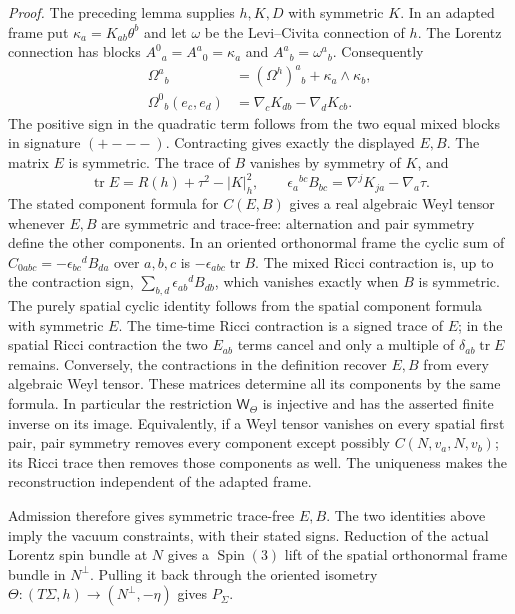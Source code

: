 \documentclass[
  english,
  11pt,
  reqno]{amsart}
\begin{document}
\emph{Proof.} The preceding lemma supplies \(h,K,D\) with symmetric
\(K\). In an adapted frame put \(\kappa_a=K_{ab}\theta^b\) and let
\(\omega\) be the Levi--Civita connection of \(h\). The Lorentz
connection has blocks \(A^0{}_a=A^a{}_0=\kappa_a\) and
\(A^a{}_b=\omega^a{}_b\). Consequently%
 \[
\begin{aligned}
\Omega^a{}_b&=(\Omega^h)^a{}_b+\kappa_a\wedge\kappa_b,\\
\Omega^0{}_b(e_c,e_d)&=\nabla_cK_{db}-\nabla_dK_{cb}.
\end{aligned}
\] The positive sign in the quadratic term follows from the two equal
mixed blocks in signature \((+---)\). Contracting gives exactly the
displayed \(E,B\). The matrix \(E\) is symmetric. The trace of \(B\)
vanishes by symmetry of \(K\), and%
 \[
\operatorname{tr}E=R(h)+\tau^2-|K|_h^2,\qquad
\epsilon_a{}^{bc}B_{bc}
=\nabla^jK_{ja}-\nabla_a\tau.
\] The stated component formula for \(C(E,B)\) gives a real algebraic
Weyl tensor whenever \(E,B\) are symmetric and trace-free: alternation
and pair symmetry define the other components. In an oriented
orthonormal frame the cyclic sum of
\(C_{0abc}=-\epsilon_{bc}{}^d B_{da}\) over \(a,b,c\) is
\(-\epsilon_{abc}\operatorname{tr}B\). The mixed Ricci contraction is,
up to the contraction sign, \(\sum_{b,d}\epsilon_{ab}{}^d B_{db}\),
which vanishes exactly when \(B\) is symmetric. The purely spatial
cyclic identity follows from the spatial component formula with
symmetric \(E\). The time-time Ricci contraction is a signed trace of
\(E\); in the spatial Ricci contraction the two \(E_{ab}\) terms cancel
and only a multiple of \(\delta_{ab}\operatorname{tr}E\) remains.
Conversely, the contractions in the definition recover \(E,B\) from
every algebraic Weyl tensor. These matrices determine all its components
by the same formula. In particular the restriction \(\mathsf W_\Theta\)
is injective and has the asserted finite inverse on its image.
Equivalently, if a Weyl tensor vanishes on every spatial first pair,
pair symmetry removes every component except possibly
\(C(N,v_a,N,v_b)\); its Ricci trace then removes those components as
well. The uniqueness makes the reconstruction independent of the adapted
frame.

Admission therefore gives symmetric trace-free \(E,B\). The two
identities above imply the vacuum constraints, with their stated signs.
Reduction of the actual Lorentz spin bundle at \(N\) gives a
\(\operatorname{Spin}(3)\) lift of the spatial orthonormal frame bundle
in \(N^\perp\). Pulling it back through the oriented isometry
\(\Theta:(T\Sigma,h)\to(N^\perp,-\eta)\) gives \(P_\Sigma\).
\end{document}
